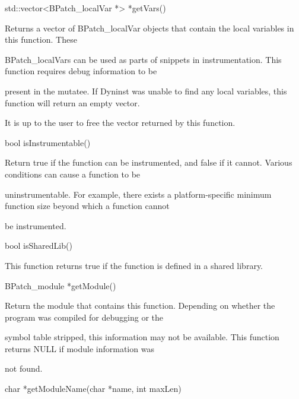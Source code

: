 {{

std::vector<BPatch_localVar *> *getVars()}



{

Returns a vector of BPatch_localVar objects that contain the local variables in this function. These

BPatch_localVars can be used as parts of snippets in instrumentation. This function requires debug information to be

present in the mutatee. If Dyninst was unable to find any local variables, this function will return an empty vector.

It is up to the user to free the vector returned by this function.}



{

bool isInstrumentable()}



{

Return true if the function can be instrumented, and false if it cannot. Various conditions can cause a function to be

uninstrumentable. For example, there exists a platform-specific minimum function size beyond which a function cannot

be instrumented.}



{

bool isSharedLib()}



{

This function returns true if the function is defined in a shared library.}



{

BPatch_module *getModule()}



{

Return the module that contains this function. Depending on whether the program was compiled for debugging or the

symbol table stripped, this information may not be available. This function returns NULL if module information was

not found.}



{

char *getModuleName(char *name, int maxLen)}



}
